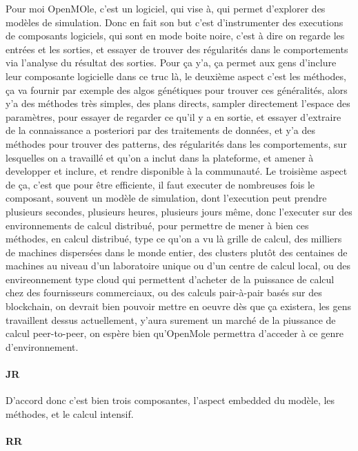 \documentclass[12pt]{article}
\begin{document}
Pour moi OpenMOle, c'est un logiciel, qui vise à, qui permet d'explorer des modèles de simulation. Donc en fait son but c'est d'instrumenter des executions de composants logiciels, qui sont en mode boite noire, c'est à dire on regarde les entrées et les sorties, et essayer de trouver des régularités dans le comportements via l'analyse du résultat des sorties. Pour ça y'a, ça permet aux gens d'inclure leur composante logicielle dans ce truc là, le deuxième aspect c'est les méthodes, ça va fournir par exemple des algos génétiques pour trouver ces généralités, alors y'a des méthodes très simples, des plans directs, sampler directement l'espace des paramètres, pour essayer de regarder ce qu'il y a en sortie, et essayer d'extraire de la connaissance a posteriori par des traitements de données, et y'a des méthodes pour trouver des patterns, des régularités dans les comportements, sur lesquelles on a travaillé et qu'on a inclut dans la plateforme, et amener à developper et inclure, et rendre disponible à la communauté. Le troisième aspect de ça, c'est que pour être efficiente, il faut executer de nombreuses fois le composant, souvent un modèle de simulation, dont l'execution peut prendre plusieurs secondes, plusieurs heures, plusieurs jours même, donc l'executer sur des environnements de calcul distribué, pour permettre de mener à bien ces méthodes, en calcul distribué, type ce qu'on a vu là grille de calcul, des milliers de machines dispersées dans le monde entier, des clusters plutôt des centaines de machines au niveau d'un laboratoire unique ou d'un centre de calcul local, ou des envireonnement type cloud qui permettent d'acheter de la puissance de calcul chez des fournisseurs commerciaux, ou des calculs pair-à-pair basés sur des blockchain, on devrait bien pouvoir mettre en oeuvre dès que ça existera, les gens travaillent dessus actuellement, y'aura surement un marché de la piussance de calcul peer-to-peer, on espère bien qu'OpenMole permettra d'acceder à ce genre d'environnement.

\paragraph{JR}

D'accord donc c'est bien trois composantes, l'aspect embedded du modèle, les méthodes, et le calcul intensif.

\paragraph{RR}
\end{document}
